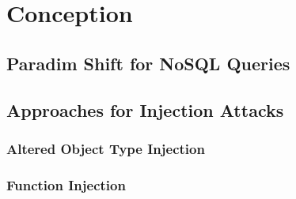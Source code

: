 \chapter{Conception}
\label{cha:conectpion}

\section{Paradim Shift for NoSQL Queries}

\section{Approaches for Injection Attacks}

\subsection{Altered Object Type Injection}

\subsection{Function Injection}
